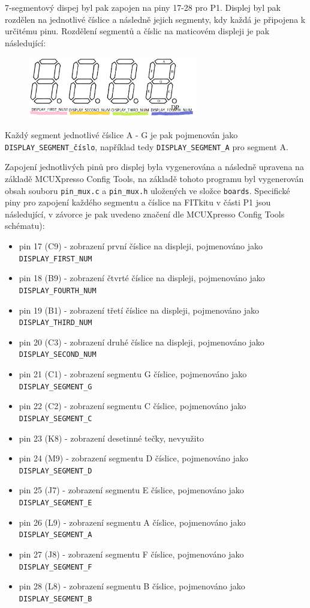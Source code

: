 \documentclass[a4paper, 11pt]{article}
\begin{document}
7-segmentový dispej byl pak zapojen na piny 17-28 pro P1. Displej byl pak rozdělen na jednotlivé číslice a následně jejich segmenty, kdy každá je připojena k určitému pinu. Rozdělení segmentů a číslic na maticovém displeji je pak následující:
\begin{figure}[htbp]
    \centering
    \includegraphics[width=280]{disp.png}
\end{figure}
Každý segment jednotlivé číslice A - G je pak pojmenován jako \verb|DISPLAY_SEGMENT_číslo|, například tedy \verb|DISPLAY_SEGMENT_A| pro segment A. 

Zapojení jednotlivých pinů pro displej byla vygenerována a následně upravena na základě MCUXpresso Config Tools, na základě tohoto programu byl vygenerován obsah souboru \verb|pin_mux.c| a \verb|pin_mux.h| uložených ve složce \verb|boards|. Specifické piny pro zapojení každého segmentu a číslice na FITkitu v části P1 jsou následující, v závorce je pak uvedeno značení dle MCUXpresso Config Tools schématu):
\begin{itemize}
    \item pin 17 (C9) - zobrazení první číslice na displeji, pojmenováno jako \verb|DISPLAY_FIRST_NUM|
    \item pin 18 (B9) - zobrazení čtvrté číslice na displeji, pojmenováno jako \verb|DISPLAY_FOURTH_NUM|
    \item pin 19 (B1) - zobrazení třetí číslice na displeji, pojmenováno jako \verb|DISPLAY_THIRD_NUM|
    \item pin 20 (C3) - zobrazení druhé číslice na displeji, pojmenováno jako \verb|DISPLAY_SECOND_NUM|
    \item pin 21 (C1) - zobrazení segmentu G číslice, pojmenováno jako \verb|DISPLAY_SEGMENT_G|
    \item pin 22 (C2) - zobrazení segmentu C číslice, pojmenováno jako \verb|DISPLAY_SEGMENT_C|
    \item pin 23 (K8) - zobrazení desetinné tečky, nevyužito
    \item pin 24 (M9) - zobrazení segmentu D číslice, pojmenováno jako \verb|DISPLAY_SEGMENT_D|
    \item pin 25 (J7) - zobrazení segmentu E číslice, pojmenováno jako \verb|DISPLAY_SEGMENT_E|
    \item pin 26 (L9) - zobrazení segmentu A číslice, pojmenováno jako \verb|DISPLAY_SEGMENT_A|
    \item pin 27 (J8) - zobrazení segmentu F číslice, pojmenováno jako \verb|DISPLAY_SEGMENT_F|
    \item pin 28 (L8) - zobrazení segmentu B číslice, pojmenováno jako \verb|DISPLAY_SEGMENT_B|
\end{itemize}
\end{document}
